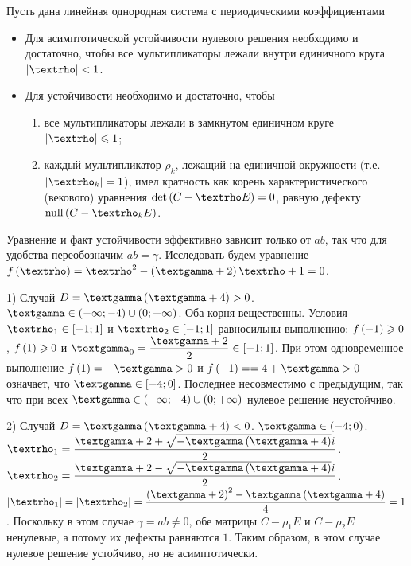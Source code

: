 \documentclass[a5paper,10pt]{article}
\begin{document}
\begin{framed}
    \begin{criteria} \end{criteria}
    Пусть дана линейная однородная система с периодическими коэффициентами
    \begin{itemize}
        \item Для асимптотической устойчивости нулевого решения необходимо и достаточно, чтобы все мультипликаторы лежали внутри единичного круга $\vbr{\rho} < 1$.
        \item Для устойчивости необходимо и достаточно, чтобы
        \begin{enumerate}
            \item все мультипликаторы лежали в замкнутом единичном круге $\vbr{\rho} \le 1$;
            \item каждый мультипликатор $\rho_{k}$, лежащий на единичной окружности (т.е. $\vbr{\rho_{k}} = 1$), имел кратность как корень характеристического (векового) уравнения $\det\br{C - \rho E} = 0$, равную дефекту $\nullity\br{C - \rho_{k} E}$.
        \end{enumerate}
    \end{itemize}
\end{framed}

Уравнение и факт устойчивости эффективно зависит только от $ab$, так что для удобства переобозначим $ab = \gamma$. Исследовать будем уравнение $f\br{\rho} = \rho^2 - \br{\gamma + 2}\rho + 1 = 0$.

1) Случай $D = \gamma \br{\gamma + 4} > 0$.
$\gamma \in \br{-\infty; -4} \cup \br{0; +\infty}$. Оба корня вещественны. \linebreak Условия $\rho_{1} \in \rbr{-1; 1}$ и $\rho_{2} \in \rbr{-1; 1}$ равносильны выполнению: $f\left(-1\right) \geqslant 0$, $f\left(1\right) \geqslant 0$ и $\gamma_{0} = \dfrac {\gamma + 2} {2} \in \rbr{-1; 1}$. При этом одновременное выполнение $f\br{1} = -\gamma > 0$ и $f\br{-1} = \linebreak = 4 + \gamma > 0$ означает, что $\gamma \in \rbr{-4; 0}$. Последнее несовместимо с предыдущим, так что при всех $\gamma \in \br{-\infty; -4} \cup \br{0; +\infty}$ нулевое решение неустойчиво.

2) Случай $D = \gamma \br{\gamma + 4} < 0$. $\gamma \in \br{-4; 0}$. \\
$\rho_{1} = \dfrac {\gamma + 2 + \sqrt{-\gamma \br{\gamma + 4}} i} {2}$.
$\rho_{2} = \dfrac {\gamma + 2 - \sqrt{-\gamma \br{\gamma + 4}} i} {2}$.
$\vbr{\rho_{1}} = \vbr{\rho_{2}} = \dfrac {\br{\gamma + 2}^2 - \gamma \br{\gamma + 4}} {4} = 1$. Поскольку в этом случае $\gamma = ab \ne 0$, обе матрицы $C - \rho_{1} E$ и $C - \rho_{2} E$ ненулевые, а потому их дефекты равняются $1$. Таким образом, в этом случае нулевое решение устойчиво, но не асимптотически.
\end{document}
